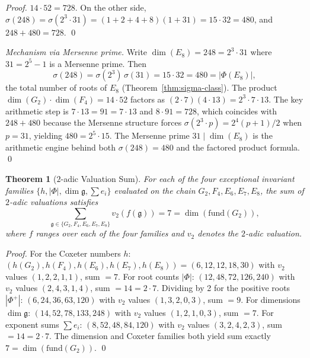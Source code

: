 \documentclass[11pt]{amsart}
\theoremstyle{plain}
\newtheorem{theorem}{Theorem}[section]
\theoremstyle{definition}
\theoremstyle{remark}
\newcommand{\fg}{\mathfrak{g}}
\renewcommand{\Phi}{\varPhi}
\begin{document}
\begin{proof}
$14 \cdot 52 = 728$.  On the other side, $\sigma(248) = \sigma(2^3 \cdot 31) =
(1+2+4+8)(1+31) = 15 \cdot 32 = 480$, and $248 + 480 = 728$. \qed
\end{proof}

\begin{proof}[Mechanism via Mersenne prime]
Write $\dim(E_8) = 248 = 2^3 \cdot 31$ where $31 = 2^5 - 1$ is a
Mersenne prime.  Then
\[
  \sigma(248) = \sigma(2^3)\,\sigma(31) = 15 \cdot 32 = 480
  = |\Phi(E_8)|,
\]
the total number of roots of $E_8$ (Theorem~\ref{thm:sigma-class}).
The product $\dim(G_2) \cdot \dim(F_4) = 14 \cdot 52$ factors as
$(2 \cdot 7)(4 \cdot 13) = 2^3 \cdot 7 \cdot 13$.  The key arithmetic
step is $7 \cdot 13 = 91 = 7 \cdot 13$ and $8 \cdot 91 = 728$, which
coincides with $248 + 480$ because the Mersenne structure forces
$\sigma(2^3 \cdot p) = 2^4(p+1)/2$ when $p = 31$, yielding
$480 = 2^5 \cdot 15$.  The Mersenne prime $31 \mid \dim(E_8)$ is the
arithmetic engine behind both $\sigma(248) = 480$ and the factored
product formula. \qed
\end{proof}

\begin{theorem}[$2$-adic Valuation Sum]\label{thm:2adic-sum}
For each of the four exceptional invariant families
$\{h, |\Phi|, \dim\fg, \sum e_i\}$ evaluated on the chain
$G_2, F_4, E_6, E_7, E_8$, the sum of $2$-adic valuations satisfies
\[
  \sum_{\fg \in \{G_2, F_4, E_6, E_7, E_8\}}
    v_2\!\left(f(\fg)\right) = 7 = \dim(\mathrm{fund}(G_2)),
\]
where $f$ ranges over each of the four families and $v_2$ denotes the
$2$-adic valuation.
\end{theorem}

\begin{proof}
For the Coxeter numbers $h$: $(h(G_2), h(F_4), h(E_6), h(E_7), h(E_8))
= (6, 12, 12, 18, 30)$ with $v_2$ values $(1, 2, 2, 1, 1)$, sum $= 7$.
For root counts $|\Phi|$: $(12, 48, 72, 126, 240)$ with $v_2$ values
$(2, 4, 3, 1, 4)$, sum $= 14 = 2 \cdot 7$.  Dividing by 2 for the
positive roots $|\Phi^+|$: $(6, 24, 36, 63, 120)$ with $v_2$ values
$(1, 3, 2, 0, 3)$, sum $= 9$.  For dimensions $\dim\fg$:
$(14, 52, 78, 133, 248)$ with $v_2$ values $(1, 2, 1, 0, 3)$, sum $= 7$.
For exponent sums $\sum e_i$: $(8, 52, 48, 84, 120)$ with $v_2$ values
$(3, 2, 4, 2, 3)$, sum $= 14 = 2 \cdot 7$.
The dimension and Coxeter families both yield sum exactly $7 = \dim(\mathrm{fund}(G_2))$.
\qed
\end{proof}
\end{document}

